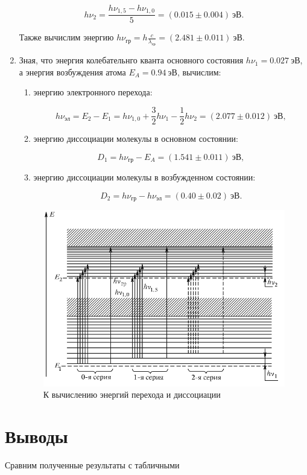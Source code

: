 \documentclass[14pt, a4paper]{report}
\begin{document}
\begin{enumerate}
\[h\nu_2=\frac{h\nu_{1,5}-h\nu_{1,0}}{5}=(0.015\pm0.004)\ эВ.\]

Также вычислим энергию $h\nu_{гр}=h\frac{c}{\lambda_{гр}}=(2.481\pm0.011)\ эВ$.

\item Зная, что энергия колебательнго кванта основного состояния $h\nu_1=0.027\ эВ$, а энергия возбуждения атома $E_A=0.94\ эВ$, вычислим:

\begin{enumerate}

\item энергию электронного перехода:

\[h\nu_{эл}=E_2-E_1=h\nu_{1,0}+\frac{3}{2}h\nu_{1}-\frac{1}{2}h\nu_{2}=(2.077\pm0.012)\ эВ,\]

\item энергию диссоциации молекулы в основном состоянии:

\[D_1=h\nu_{гр}-E_A=(1.541\pm0.011)\ эВ,\]

\item энергию диссоциации молекулы в возбужденном состоянии:

\[D_2=h\nu_{гр}-h\nu_{эл}=(0.40\pm0.02)\ эВ.\]

\end{enumerate}

\begin{figure}[H]
\centering
\includegraphics[scale=0.6]{../images/523-4}
\caption{К вычислению энергий перехода и диссоциации}
\end{figure}

\end{enumerate}

\section{Выводы}

Сравним полученные результаты с табличными
\end{document}
